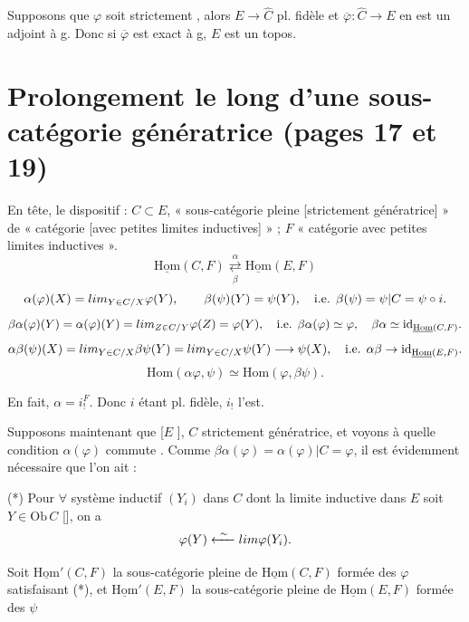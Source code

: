 \documentclass[11pt,a4paper]{article}
\begin{document}
Supposons que $\varphi$ soit strictement ,
 alors $E \to \widehat{C}$  pl. fidèle
et $\overline{\varphi} : \widehat{C} \to E$ en est un adjoint à g.
 Donc si $\overline{\varphi}$ est
exact à g, $E$ est un topos.

\section*{Prolongement le long d'une sous-catégorie génératrice (pages 17 et 19)}

En tête, le dispositif : $C \subset E$, « sous-catégorie pleine
[strictement génératrice] » de « catégorie [avec petites limites
inductives] » ; $F$ « catégorie avec petites limites inductives ».
\[
\underline{\mathrm{Hom}}(C, F)
\underset{\beta}{\overset{\alpha}{\rightleftarrows}}
\underline{\mathrm{Hom}}(E, F)
\]
\[
\alpha(\varphi)(X) = \varinjlim_{Y \in C/X} \varphi(Y),
\qquad
\beta(\psi)(Y) = \psi(Y), \quad \text{i.e. } \beta(\psi) = \psi | C
= \psi \circ i.
\]
\[
\beta\alpha(\varphi)(Y) = \alpha(\varphi)(Y)
= \varinjlim_{Z \in C/Y} \varphi(Z) = \varphi(Y),
\quad \text{i.e. } \beta\alpha(\varphi) \simeq \varphi, \quad
\beta\alpha \simeq \mathrm{id}_{\underline{\mathrm{Hom}}(C,F)}.
\]
\[
\alpha\beta(\psi)(X) = \varinjlim_{Y \in C/X} \beta\psi(Y)
= \varinjlim_{Y \in C/X} \psi(Y) \longrightarrow \psi(X),
\quad \text{i.e. } \alpha\beta \to \mathrm{id}_{\underline{\mathrm{Hom}}(E,F)}.
\]
\[
\mathrm{Hom}(\alpha\varphi, \psi) \simeq \mathrm{Hom}(\varphi, \beta\psi).
\]

En fait, $\alpha = i^{F}_{!}$. Donc $i$ étant pl. fidèle, $i_{!}$ l'est.

Supposons maintenant que [$E$ ], $C$ strictement génératrice, et voyons à quelle condition
$\alpha(\varphi)$ commute . Comme
$\beta\alpha(\varphi) = \alpha(\varphi)|C = \varphi$, il est évidemment
nécessaire que l'on ait :

(*) Pour $\forall$ système inductif $(Y_i)$ dans $C$ dont la limite
inductive dans $E$  soit $Y \in \mathrm{Ob}\,C$
[], on a
\[
\varphi(Y) \xleftarrow{\ \sim\ } \varinjlim \varphi(Y_i).
\]

Soit $\underline{\mathrm{Hom}}'(C, F)$ la sous-catégorie pleine de
$\underline{\mathrm{Hom}}(C, F)$ formée des $\varphi$ satisfaisant (*), et
$\underline{\mathrm{Hom}}'(E, F)$ la sous-catégorie pleine de
$\underline{\mathrm{Hom}}(E, F)$ formée des $\psi$
\end{document}
